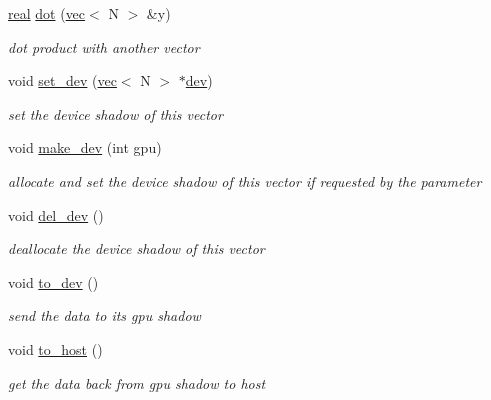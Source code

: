 \begin{DoxyCompactItemize}
\hyperlink{vgg__util_8h_a1082d08aaa761215ec83e7149f27ad16}{real} \hyperlink{structvec_a025135937b054f373be71ef417f2bc89}{dot} (\hyperlink{structvec}{vec}$<$ N $>$ \&y)
\begin{DoxyCompactList}\small\item\em dot product with another vector \end{DoxyCompactList}\item 
void \hyperlink{structvec_a7f8e5821a38f3ef76ed82a165e142774}{set\+\_\+dev} (\hyperlink{structvec}{vec}$<$ N $>$ $\ast$\hyperlink{structvec_a8ea19d04a43f99871fcf4bff8b5b25b2}{dev})
\begin{DoxyCompactList}\small\item\em set the device shadow of this vector \end{DoxyCompactList}\item 
void \hyperlink{structvec_aa76a528a4e148d4d68e8a801c80c66e8}{make\+\_\+dev} (int gpu)
\begin{DoxyCompactList}\small\item\em allocate and set the device shadow of this vector if requested by the parameter \end{DoxyCompactList}\item 
\mbox{\label{structvec_a71c7ac4018b635848bd6b6e2ea22fe04}} 
void \hyperlink{structvec_a71c7ac4018b635848bd6b6e2ea22fe04}{del\+\_\+dev} ()
\begin{DoxyCompactList}\small\item\em deallocate the device shadow of this vector \end{DoxyCompactList}\item 
\mbox{\label{structvec_a44523c6b6412b8a23a9c5738168d76f3}} 
void \hyperlink{structvec_a44523c6b6412b8a23a9c5738168d76f3}{to\+\_\+dev} ()
\begin{DoxyCompactList}\small\item\em send the data to its gpu shadow \end{DoxyCompactList}\item 
\mbox{\label{structvec_aadf14a73591b19988968c6f9bf6c88bb}} 
void \hyperlink{structvec_aadf14a73591b19988968c6f9bf6c88bb}{to\+\_\+host} ()
\begin{DoxyCompactList}\small\item\em get the data back from gpu shadow to host \end{DoxyCompactList}\end{DoxyCompactItemize}
